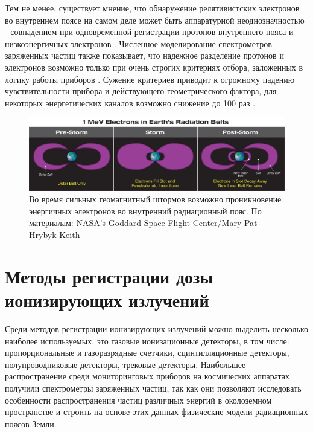 Тем не менее, существует мнение, что обнаружение релятивистских электронов во внутреннем поясе на самом деле может быть аппаратурной неоднозначностью - совпадением при одновременной регистрации протонов внутреннего пояса и низкоэнергичных электронов \cite{Selesnick2015}. Численное моделирование спектрометров заряженных частиц также показывает, что надежное разделение протонов и электронов возможно только при очень строгих критериях отбора, заложенных в логику работы приборов \cite{zolotarev2017numerical51590279}. Сужение критериев приводит к огромному падению чувствительности прибора и действующего геометрического фактора, для некоторых энергетических каналов возможно снижение до 100 раз \cite{zolotarev2017numerical51590279}.
 
\begin{figure}
	\centering
	\includegraphics[width=0.7\linewidth]{images/inner_electron_belt_illustration}
	\caption[Образование долгоживущего внутреннего электронного пояса]{ Во время сильных геомагнитный штормов возможно проникновение энергичных электронов во внутренний радиационный пояс. По материалам: NASA’s Goddard Space Flight Center/Mary Pat Hrybyk-Keith \cite{Johnson-Groh2017}}
	\label{fig:innerelectronbeltillustration}
\end{figure}

\section{Методы регистрации дозы ионизирующих излучений} \label{sect1_2}

Среди методов регистрации ионизирующих излучений можно выделить несколько наиболее используемых, это газовые ионизационные детекторы, в том числе: пропорциональные и газоразрядные счетчики, сцинтилляционные детекторы, полупроводниковые детекторы, трековые детекторы. Наибольшее распространение среди мониторинговых приборов на космических аппаратах получили спектрометры заряженных частиц, так как они позволяют исследовать особенности распространения частиц различных энергий в околоземном пространстве и строить на основе этих данных физические модели радиационных поясов Земли.

